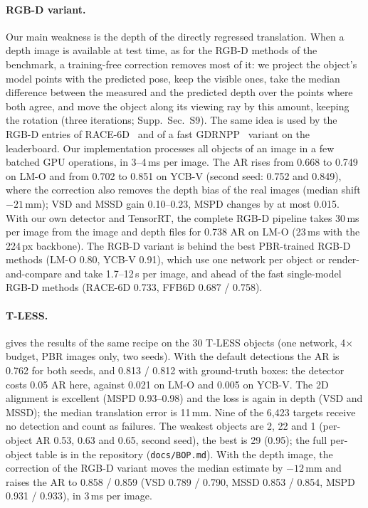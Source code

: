 \paragraph{RGB-D variant.}
Our main weakness is the depth of the directly regressed translation. When a depth image is
available at test time, as for the RGB-D methods of the benchmark, a training-free correction
removes most of it: we project the object's model points with the predicted pose, keep the
visible ones, take the median difference between the measured and the predicted depth over the
points where both agree, and move the object along its viewing ray by this amount, keeping the
rotation (three iterations; Supp.~Sec.~S9). The same idea is used by the RGB-D entries of
RACE-6D~\cite{ha2026race6d} and of a fast GDRNPP~\cite{liu2022gdrnpp} variant on the leaderboard. Our implementation processes all objects
of an image in a few batched GPU operations, in 3--4\,ms per image. The AR rises from 0.668 to
0.749 on LM-O and from 0.702 to 0.851 on YCB-V (second seed: 0.752 and 0.849), where the correction
also removes the depth bias of the real images (median shift $-21$\,mm); VSD and MSSD gain
0.10--0.23, MSPD changes by at most 0.015. With our own detector and TensorRT, the complete RGB-D
pipeline takes 30\,ms per image from the image and depth files for 0.738 AR on LM-O (23\,ms with
the 224\,px backbone). The RGB-D variant is behind the best
PBR-trained RGB-D methods (LM-O 0.80, YCB-V 0.91), which use one network per object or
render-and-compare and take 1.7--12\,s per image, and ahead of the fast single-model RGB-D methods
(RACE-6D 0.733, FFB6D 0.687 / 0.758).

\paragraph{T-LESS.}
 gives the results of the same recipe on the 30 T-LESS objects (one network, 4$\times$
budget, PBR images only, two seeds). With the default detections the AR is 0.762 for both seeds,
and 0.813 / 0.812 with ground-truth boxes: the detector costs 0.05 AR here, against 0.021 on LM-O
and 0.005 on YCB-V. The 2D alignment is excellent (MSPD 0.93--0.98) and the loss is again in depth
(VSD and MSSD); the median translation error is 11\,mm. Nine of the 6,423 targets receive no
detection and count as failures. The weakest objects are 2, 22 and 1 (per-object AR 0.53, 0.63 and
0.65, second seed), the best is 29 (0.95); the full per-object table is in the repository
(\texttt{docs/BOP.md}). With the depth image, the correction of the RGB-D variant moves the median
estimate by $-12$\,mm and raises the AR to 0.858 / 0.859 (VSD 0.789 / 0.790, MSSD 0.853 / 0.854,
MSPD 0.931 / 0.933), in 3\,ms per image.

